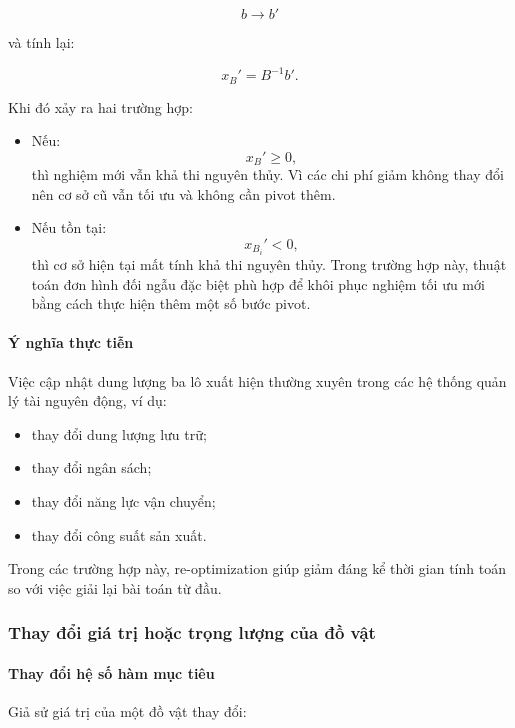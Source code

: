 \documentclass[fontsize=13pt,a4paper]{report}
\begin{document}
\[
b \rightarrow b'
\]

và tính lại:

\[
x_B' = B^{-1}b'.
\]

Khi đó xảy ra hai trường hợp:

\begin{itemize}

    \item Nếu:
    \[
    x_B' \ge 0,
    \]
    thì nghiệm mới vẫn khả thi nguyên thủy. Vì các chi phí giảm không thay đổi nên cơ sở cũ vẫn tối ưu và không cần pivot thêm.

    \item Nếu tồn tại:
    \[
    x_{B_i}' < 0,
    \]
    thì cơ sở hiện tại mất tính khả thi nguyên thủy. Trong trường hợp này, thuật toán đơn hình đối ngẫu đặc biệt phù hợp để khôi phục nghiệm tối ưu mới bằng cách thực hiện thêm một số bước pivot.

\end{itemize}

\paragraph{Ý nghĩa thực tiễn}

Việc cập nhật dung lượng ba lô xuất hiện thường xuyên trong các hệ thống quản lý tài nguyên động, ví dụ:

\begin{itemize}
    \item thay đổi dung lượng lưu trữ;
    \item thay đổi ngân sách;
    \item thay đổi năng lực vận chuyển;
    \item thay đổi công suất sản xuất.
\end{itemize}

Trong các trường hợp này, re-optimization giúp giảm đáng kể thời gian tính toán so với việc giải lại bài toán từ đầu.

\subsubsection{Thay đổi giá trị hoặc trọng lượng của đồ vật}

\paragraph{Thay đổi hệ số hàm mục tiêu}

Giả sử giá trị của một đồ vật thay đổi:
\end{document}
